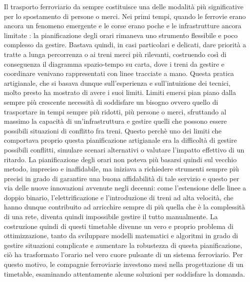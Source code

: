 \documentclass[a4paper,12pt]{report}
\begin{document}
Il trasporto ferroviario da sempre costituisce una delle modalità più significative per lo spostamento di persone o merci. Nei primi tempi, quando le ferrovie erano ancora un fenomeno emergente e le corse erano poche e le infrastrutture ancora limitate : la pianificazione degli orari rimaneva uno strumento flessibile e poco complesso da gestire. Bastava quindi, in casi particolari e delicati, dare priorità a tratte a lunga percorrenza o ai treni merci più rilevanti, costruendo così di conseguenza il diagramma spazio-tempo su carta, dove i treni da gestire e coordinare venivano rappresentati con linee tracciate a mano. Questa pratica artigianale, che si basava dunque sull'esperienza e sull'intuizione dei tecnici, molto presto ha mostrato di avere i suoi limiti. Limiti emersi pian piano dalla sempre più crescente necessità di soddisfare un bisogno ovvero quello di trasportare in tempi sempre più ridotti, più persone o merci, sfruttando al massimo la capacità di un'infrastruttura e gestire quelli che possono essere possibili situazioni di conflitto fra treni.
Questo perchè uno dei limiti che comportava proprio questa pianificazione artigianale era la difficoltà di gestire possibili conflitti, simulare scenari alternativi o valutare l’impatto effettivo di un ritardo. 
La pianificazione degli orari non poteva più basarsi quindi sul vecchio metodo, impreciso e inaffidabile, ma iniziava a richiedere strumenti sempre più precisi in grado di garantire una buona affidabilità di tale servizio e questo per via delle nuove innovazioni avvenute negli decenni: come l'estensione delle linee a doppio binario, l'elettrificazione e l'introduzione di treni ad alta velocità, che hanno dunque contribuito ad arricchire sempre di più quella che è la complessità di una rete, diventa quindi impossibile gestire il tutto manualmente. La costruzione quindi di questi timetable divenne un vero e proprio problema di ottimizzazione, tanto da sviluppare modelli matematici e algoritmi in grado di gestire situazioni complicate e aumentare la robustezza di questa pianificazione, ciò ha trasformato l'orario nel vero cuore pulsante di un sistema ferroviario.
Per questo motivo, le compagnie ferroviarie investono mesi nella progettazione di un timetable, esaminando attentamente alcune soluzioni per soddisfare la domanda.
\end{document}
